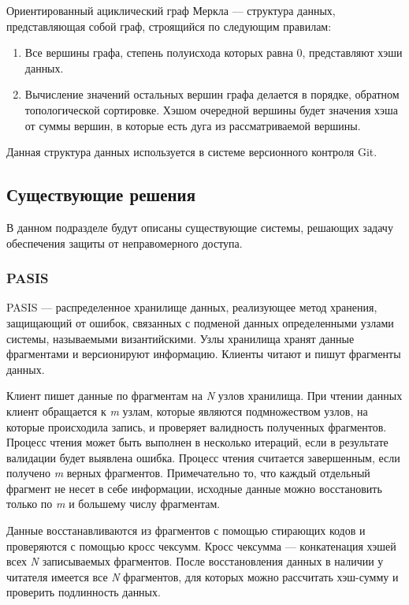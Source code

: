 Ориентированный ациклический граф Меркла\cite{merkledag} --- структура данных, представляющая собой граф, строящийся по следующим правилам:
\begin{enumerate}
    \item Все вершины графа, степень полуисхода\cite{graphs} которых равна 0, представляют хэши данных.
    \item Вычисление значений остальных вершин графа делается в порядке, обратном топологической сортировке\cite{topsort}. Хэшом очередной вершины будет значения хэша от суммы вершин, в которые есть дуга из рассматриваемой вершины.
\end{enumerate}

%
Данная структура данных используется в системе версионного контроля Git\cite{git}.

\subsection{Существующие решения}

В данном подразделе будут описаны существующие системы, решающих задачу обеспечения защиты от неправомерного доступа.

\subsubsection{PASIS}

\label{par:pasis}

PASIS\cite{pasis} --- распределенное хранилище данных, реализующее метод хранения, защищающий от ошибок, связанных с подменой данных определенными узлами системы, называемыми византийскими. Узлы хранилища хранят данные фрагментами и версионируют информацию. Клиенты читают и пишут фрагменты данных.

Клиент пишет данные по фрагментам на \textit{N} узлов хранилища. При чтении данных клиент обращается к \textit{m} узлам, которые являются подмножеством узлов, на которые происходила запись, и проверяет валидность полученных фрагментов. Процесс чтения может быть выполнен в несколько итераций, если в результате валидации будет выявлена ошибка. Процесс чтения считается завершенным, если получено \textit{m} верных фрагментов. Примечательно то, что каждый отдельный фрагмент не несет в себе информации, исходные данные можно восстановить только по \textit{m} и большему числу фрагментам.

Данные восстанавливаются из фрагментов с помощью стирающих кодов\cite{erasurecode} и проверяются с помощью кросс чексумм. Кросс чексумма --- конкатенация хэшей всех \textit{N} записываемых фрагментов. После восстановления данных в наличии у читателя имеется все \textit{N} фрагментов, для которых можно рассчитать хэш-сумму и проверить подлинность данных.


